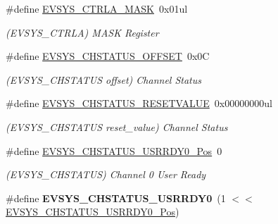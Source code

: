 \begin{DoxyCompactItemize}
\item 
\hypertarget{group___s_a_m_l21___e_v_s_y_s_gae851c5e39c0d41b3abee6745e40ec2db}{}\#define \hyperlink{group___s_a_m_l21___e_v_s_y_s_gae851c5e39c0d41b3abee6745e40ec2db}{E\+V\+S\+Y\+S\+\_\+\+C\+T\+R\+L\+A\+\_\+\+M\+A\+S\+K}~0x01ul\label{group___s_a_m_l21___e_v_s_y_s_gae851c5e39c0d41b3abee6745e40ec2db}

\begin{DoxyCompactList}\small\item\em (E\+V\+S\+Y\+S\+\_\+\+C\+T\+R\+L\+A) M\+A\+S\+K Register \end{DoxyCompactList}\item 
\hypertarget{group___s_a_m_l21___e_v_s_y_s_ga1feb1c1fba23446f2caa0e152ce7eb6c}{}\#define \hyperlink{group___s_a_m_l21___e_v_s_y_s_ga1feb1c1fba23446f2caa0e152ce7eb6c}{E\+V\+S\+Y\+S\+\_\+\+C\+H\+S\+T\+A\+T\+U\+S\+\_\+\+O\+F\+F\+S\+E\+T}~0x0\+C\label{group___s_a_m_l21___e_v_s_y_s_ga1feb1c1fba23446f2caa0e152ce7eb6c}

\begin{DoxyCompactList}\small\item\em (E\+V\+S\+Y\+S\+\_\+\+C\+H\+S\+T\+A\+T\+U\+S offset) Channel Status \end{DoxyCompactList}\item 
\hypertarget{group___s_a_m_l21___e_v_s_y_s_ga3d2d7543ed2981a7d35fbee301599189}{}\#define \hyperlink{group___s_a_m_l21___e_v_s_y_s_ga3d2d7543ed2981a7d35fbee301599189}{E\+V\+S\+Y\+S\+\_\+\+C\+H\+S\+T\+A\+T\+U\+S\+\_\+\+R\+E\+S\+E\+T\+V\+A\+L\+U\+E}~0x00000000ul\label{group___s_a_m_l21___e_v_s_y_s_ga3d2d7543ed2981a7d35fbee301599189}

\begin{DoxyCompactList}\small\item\em (E\+V\+S\+Y\+S\+\_\+\+C\+H\+S\+T\+A\+T\+U\+S reset\+\_\+value) Channel Status \end{DoxyCompactList}\item 
\hypertarget{group___s_a_m_l21___e_v_s_y_s_ga6ea71e693d005416c8deaf7964702e54}{}\#define \hyperlink{group___s_a_m_l21___e_v_s_y_s_ga6ea71e693d005416c8deaf7964702e54}{E\+V\+S\+Y\+S\+\_\+\+C\+H\+S\+T\+A\+T\+U\+S\+\_\+\+U\+S\+R\+R\+D\+Y0\+\_\+\+Pos}~0\label{group___s_a_m_l21___e_v_s_y_s_ga6ea71e693d005416c8deaf7964702e54}

\begin{DoxyCompactList}\small\item\em (E\+V\+S\+Y\+S\+\_\+\+C\+H\+S\+T\+A\+T\+U\+S) Channel 0 User Ready \end{DoxyCompactList}\item 
\hypertarget{group___s_a_m_l21___e_v_s_y_s_gad102b5f720bf2ddfb32edea095c50649}{}\#define {\bfseries E\+V\+S\+Y\+S\+\_\+\+C\+H\+S\+T\+A\+T\+U\+S\+\_\+\+U\+S\+R\+R\+D\+Y0}~(1 $<$$<$ \hyperlink{group___s_a_m_l21___e_v_s_y_s_ga6ea71e693d005416c8deaf7964702e54}{E\+V\+S\+Y\+S\+\_\+\+C\+H\+S\+T\+A\+T\+U\+S\+\_\+\+U\+S\+R\+R\+D\+Y0\+\_\+\+Pos})\label{group___s_a_m_l21___e_v_s_y_s_gad102b5f720bf2ddfb32edea095c50649}


\end{DoxyCompactItemize}
